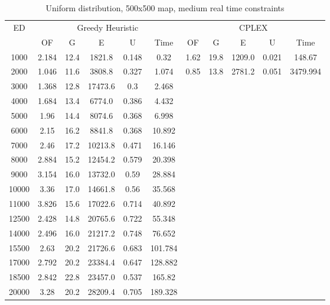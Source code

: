 \begin{table}[htb]
	\centering
	\begin{tabular}{|c|c|c|c|c|c|c|c|c|c|c|}
		\hline
		\multirow{2}{*}{ED} & \multicolumn{5}{c|}{Greedy Heuristic} & \multicolumn{5}{c|}{CPLEX}\\ 
		\cline{2-11}
& OF & G & E & U & Time & OF & G & E & U & Time\\ 
		\hline
		1000 & 2.184 & 12.4 & 1821.8 & 0.148 & 0.32 & 1.62 & 19.8 & 1209.0 & 0.021 & 148.67 \\ 
		2000 & 1.046 & 11.6 & 3808.8 & 0.327 & 1.074 & 0.85 & 13.8 & 2781.2 & 0.051 & 3479.994 \\ 
		3000 & 1.368 & 12.8 & 17473.6 & 0.3 & 2.468 & & & & &  \\ 
		4000 & 1.684 & 13.4 & 6774.0 & 0.386 & 4.432 & & & & &  \\ 
		5000 & 1.96 & 14.4 & 8074.6 & 0.368 & 6.998 & & & & &  \\ 
		6000 & 2.15 & 16.2 & 8841.8 & 0.368 & 10.892 & & & & &  \\ 
		7000 & 2.46 & 17.2 & 10213.8 & 0.471 & 16.146 & & & & &  \\ 
		8000 & 2.884 & 15.2 & 12454.2 & 0.579 & 20.398 & & & & &  \\ 
		9000 & 3.154 & 16.0 & 13732.0 & 0.59 & 28.884 & & & & &  \\ 
		10000 & 3.36 & 17.0 & 14661.8 & 0.56 & 35.568 & & & & &  \\ 
		11000 & 3.826 & 15.6 & 17022.6 & 0.714 & 40.892 & & & & &  \\ 
		12500 & 2.428 & 14.8 & 20765.6 & 0.722 & 55.348 & & & & &  \\ 
		14000 & 2.496 & 16.0 & 21217.2 & 0.748 & 76.652 & & & & &  \\ 
		15500 & 2.63 & 20.2 & 21726.6 & 0.683 & 101.784 & & & & &  \\ 
		17000 & 2.792 & 20.2 & 23384.4 & 0.647 & 128.882 & & & & &  \\ 
		18500 & 2.842 & 22.8 & 23457.0 & 0.537 & 165.82 & & & & &  \\ 
		20000 & 3.28 & 20.2 & 28209.4 & 0.705 & 189.328 & & & & &  \\ 
		\hline 
	\end{tabular} 
	\caption{Uniform distribution, 500x500 map, medium real time constraints} 
	\label{tab:unif_medium_n_esc_500} 
\end{table} 

